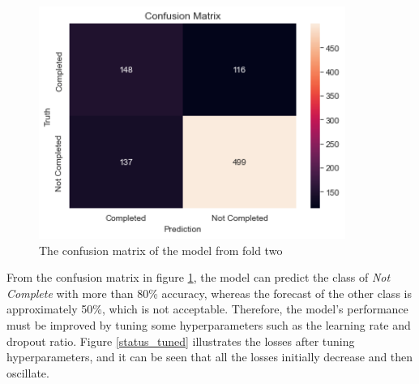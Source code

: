 \documentclass[12pt,twoside]{report}
\begin{document}
\begin{figure}[h]
	\centering
	\includegraphics[width=10cm]{cm_dropout2}
	\caption{The confusion matrix of the model from fold two}
	\label{status_dropout_prediction}
\end{figure}

From the confusion matrix in figure \ref{status_dropout_prediction}, the model can predict the class of \textit{Not Complete} with more than 80\% accuracy, whereas the forecast of the other class is approximately 50\%, which is not acceptable. Therefore, the model's performance must be improved by tuning some hyperparameters such as the learning rate and dropout ratio. Figure \ref{status_tuned} illustrates the losses after tuning hyperparameters, and it can be seen that all the losses initially decrease and then oscillate. 
\\
\end{document}
